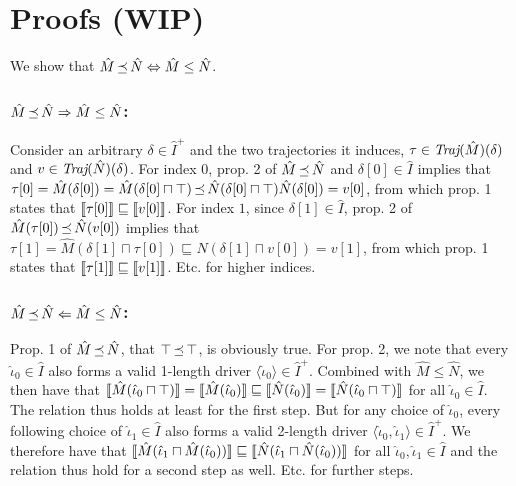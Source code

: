 \section{Proofs (WIP)}

We show that $\hat M \operatorname{\preceq} \hat N \Leftrightarrow \hat M \leq \hat N$.

\subsubsection{$\hat M \operatorname{\preceq} \hat N \Rightarrow \hat M \leq \hat N$:}

Consider an arbitrary $\delta \in \hat I^{+}$ and the two trajectories it induces, $\tau \in \operatorname{\textit{Traj}}(\hat M)(\delta)$ and $v \in \operatorname{\textit{Traj}}(\hat N)(\delta)$. For index $0$, prop. 2 of $\hat M \operatorname{\preceq} \hat N$ and $\delta[0] \in \hat I$ implies that $\tau[0] = \hat M(\delta[0]) = \hat M(\delta[0] \sqcap \top) \operatorname{\preceq} \hat N(\delta[0] \sqcap \top) \hat N(\delta[0]) = v[0]$, from which prop. 1 states that $\llbracket\tau[0]\rrbracket \sqsubseteq \llbracket v[0]\rrbracket$. For index $1$, since $\delta[1] \in \hat I$, prop. 2 of $\hat M(\tau[0]) \operatorname{\preceq} \hat N(v[0])$ implies that $\tau[1] = \hat M(\delta[1] \sqcap \tau[0]) \sqsubseteq \hat N(\delta[1] \sqcap v[0]) = v[1]$, from which prop. 1 states that $\llbracket\tau[1]\rrbracket \sqsubseteq \llbracket v[1]\rrbracket$. Etc. for higher indices.

\subsubsection{$\hat M \operatorname{\preceq} \hat N \Leftarrow \hat M \leq \hat N$:}

Prop. 1 of $\hat M \operatorname{\preceq} \hat N$, that $\top \operatorname{\preceq} \top$, is obviously true. For prop. 2, we note that every $\hat \iota_{0} \in \hat I$ also forms a valid 1-length driver $\langle \hat \iota_{0} \rangle \in \hat I^{+}$. Combined with $\hat M \leq \hat N$, we then have that $\llbracket\hat M(\hat \iota_{0} \sqcap \top)\rrbracket = \llbracket\hat M(\hat \iota_{0})\rrbracket \sqsubseteq \llbracket\hat N(\hat \iota_{0})\rrbracket = \llbracket\hat N(\hat \iota_{0} \sqcap \top)\rrbracket$ for all $\hat \iota_{0} \in \hat I$. The relation thus holds at least for the first step. But for any choice of $\hat \iota_{0}$, every following choice of $\hat \iota_{1} \in \hat I$ also forms a valid 2-length driver $\langle \hat \iota_{0}, \hat \iota_{1} \rangle \in \hat I^{+}$. We therefore have that $\llbracket\hat M(\hat \iota_{1} \sqcap \hat M(\hat \iota_{0}))\rrbracket \sqsubseteq \llbracket\hat N(\hat \iota_{1} \sqcap \hat N(\hat \iota_{0}))\rrbracket$ for all $\hat \iota_{0}, \hat \iota_{1} \in \hat I$ and the relation thus hold for a second step as well. Etc. for further steps.

